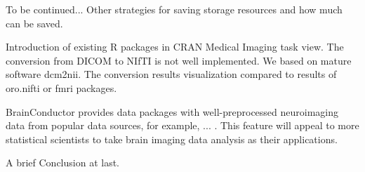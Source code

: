 \documentclass{nature}
\begin{document}
To be continued...
Other strategies for saving storage resources and how much can be saved.
 
Introduction of existing R packages in CRAN Medical Imaging task view.  
The conversion from DICOM to NIfTI is not well implemented. We based on mature software dcm2nii. The conversion results visualization compared to results of oro.nifti or fmri packages.

BrainConductor provides data packages with well-preprocessed neuroimaging data from popular data sources, for example, ... . This feature will appeal to more statistical scientists to take brain imaging data analysis as their applications.

 
A brief Conclusion at last.


 

             	                                        
 		                                                  
\end{document}
